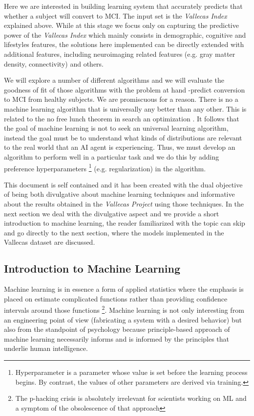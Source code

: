 \documentclass[11pt]{article}
\begin{document}
Here we are interested in building learning system that accurately predicts that whether a subject will convert to MCI. The input set is the \emph{Vallecas Index} explained above. While at this stage we focus only on capturing the predictive power of the \emph{Vallecas Index} which mainly consists in demographic, cognitive and lifestyles features, the solutions here implemented can be directly extended with additional features, including neuroimaging related features (e.g. gray matter density, connectivity) and others.

We will explore a number of different algorithms and we will evaluate the goodness of fit of those algorithms with the problem at hand -predict conversion to MCI from healthy subjects. We are promiscuous for a reason. There is no a machine learning algorithm that is universally any better than any other. This is related to the no free lunch theorem in search an optimization \cite{wolpert1997no}. It follows that the goal of machine learning is not to seek an universal learning algorithm, instead the goal must be to understand what kinds of distributions are relevant to the real world that an AI agent is experiencing. Thus, we must develop an algorithm to perform well in a particular task and we do this by adding preference hyperparameters \footnote{Hyperparameter is a parameter whose value is set before the learning process begins. By contrast, the values of other parameters are derived via training.} (e.g. regularization) in the algorithm.  

This document is self contained and it has been created with the dual objective of being both divulgative about machine learning techniques and informative about the results obtained in the \emph{Vallecas Project} using those techniques.
In the next section we deal with the divulgative aspect and we provide a short introduction to machine learning, the reader familiarized with the topic can skip and go directly to the next section, where the models implemented in the Vallecas dataset are discussed.


\subsection{Introduction to Machine Learning} 
\label{sse:iml}
Machine learning is in essence a form of applied statistics where the emphasis is placed on estimate complicated functions rather than providing confidence intervals around those functions \footnote{The p-hacking crisis is absolutely irrelevant for scientists working on ML and a symptom of the obsolescence of that approach}. Machine learning is not only interesting from an engineering point of view (fabricating a system with a desired behavior) but also from the standpoint of psychology because principle-based approach of machine learning necessarily informs and is informed by the principles that underlie human intelligence.
\end{document}
